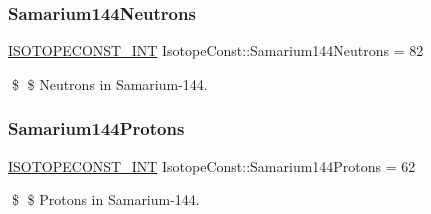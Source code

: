 \subsubsection{\texorpdfstring{Samarium144\+Neutrons}{Samarium144Neutrons}}
{\footnotesize\ttfamily \mbox{\hyperlink{group___isotope_const-_macros_ga5f18360b3e99483a35c32d789e62621c}{I\+S\+O\+T\+O\+P\+E\+C\+O\+N\+S\+T\+\_\+\+I\+NT}} Isotope\+Const\+::\+Samarium144\+Neutrons = 82}

\$ \$ Neutrons in Samarium-\/144. \mbox{\label{group___isotope_const-_samarium-_sm144_ga1f2f44d7cf23cf98a6dbb2819481db60}} 
\subsubsection{\texorpdfstring{Samarium144\+Protons}{Samarium144Protons}}
{\footnotesize\ttfamily \mbox{\hyperlink{group___isotope_const-_macros_ga5f18360b3e99483a35c32d789e62621c}{I\+S\+O\+T\+O\+P\+E\+C\+O\+N\+S\+T\+\_\+\+I\+NT}} Isotope\+Const\+::\+Samarium144\+Protons = 62}

\$ \$ Protons in Samarium-\/144. 